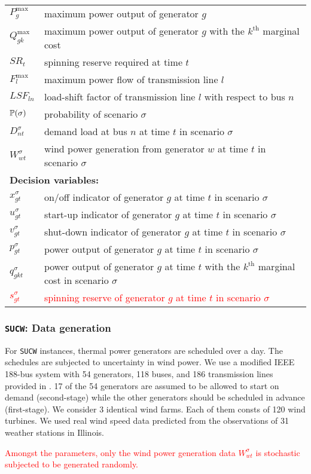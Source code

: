 \begin{table}[H]
\begin{tabular}{ll}
		$P^\text{max}_g$ & maximum power output of generator $g$ \\
		$Q^\text{max}_{gk}$ & maximum power output of generator $g$ with the $k^\textrm{th}$ marginal cost \\
		$SR_t$ & spinning reserve required at time $t$ \\
		$F^\text{max}_l$ & maximum power flow of transmission line $l$ \\
		$LSF_{ln}$ & load-shift factor of transmission line $l$ with respect to bus $n$ \\
		$\operatorname*{\mathbb{P}}(\sigma)$ & probability of scenario $\sigma$ \\
		$D_{nt}^\sigma$ & demand load at bus $n$ at time $t$ in scenario $\sigma$ \\
		$W_{wt}^\sigma$ & wind power generation from generator $w$ at time $t$ in scenario $\sigma$ \\ \midrule
		\multicolumn{2}{l}{\textbf{Decision variables:}} \\
		$x_{gt}^\sigma$ & on/off indicator of generator $g$ at time $t$ in scenario $\sigma$\\
		$u_{gt}^\sigma $ & start-up indicator of generator $g$ at time $t$ in scenario $\sigma$\\
		$v_{gt}^\sigma $ & shut-down indicator of generator $g$ at time $t$ in scenario $\sigma$ \\
		$p_{gt}^\sigma$ & power output of generator $g$ at time $t$ in scenario $\sigma$ \\
		$q_{gkt}^\sigma$ & power output of generator $g$ at time $t$ with the $k^\textrm{th}$ marginal cost in scenario $\sigma$\\
		\textcolor{red}{$s_{gt}^\sigma$} & \textcolor{red}{spinning reserve of generator $g$ at time $t$ in scenario $\sigma$} \\
		\hline
	\end{tabular}
\end{table}


\subsubsection{\texttt{SUCW}: Data generation}
For \texttt{SUCW} instances, thermal power generators are scheduled over a day. The schedules are subjected to uncertainty in wind power. We use a modified IEEE 188-bus system with 54 generators, 118 buses, and 186 transmission lines provided in \cite{journal:LLMS2014}. 17 of the 54 generators are assumed to be allowed to start on demand (second-stage) while the other generators should be scheduled in advance (first-stage). We consider 3 identical wind farms. Each of them consts of  120 wind turbines. We used real wind speed data predicted from the observations of 31 weather stations in Illinois.

\textcolor{red}{Amongst the parameters, only the wind power generation data $W_{wt}^\sigma$ is stochastic subjected to be generated randomly.}